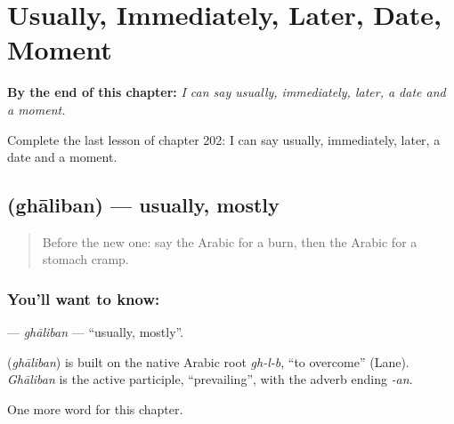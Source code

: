 
\chapter{Usually, Immediately, Later, Date, Moment}
\label{ch:ar-usually-immediately-later-date-moment}

\begin{chapteropening}
\textbf{By the end of this chapter:} \emph{I can say usually, immediately, later, a date and a moment.}

Complete the last lesson of chapter 202: I can say usually, immediately, later, a date and a moment.
\end{chapteropening}

\section[\texorpdfstring{\ar{غالبا} (ghāliban)}{غالبا (ghāliban)}]{ (ghāliban) — usually, mostly}

\label{lesson:AR-C202-ghaliban}



\begin{quote}
Before the new one: say the Arabic for a burn, then the Arabic for a stomach cramp.
\end{quote}

\subsection*{You'll want to know: }
\textbf{} — \emph{ghāliban} — \textquotedblleft{}usually, mostly\textquotedblright{}.

\begin{cousinweb}
\textbf{} (\emph{ghāliban}) is built on the native Arabic root \emph{gh-l-b}, \textquotedblleft{}to overcome\textquotedblright{} (Lane). \emph{Ghāliban} is the active participle, \textquotedblleft{}prevailing\textquotedblright{}, with the adverb ending \emph{-an}.
\end{cousinweb}

\begin{grammarlens}[title={What you've built}]
One more word for this chapter.
\end{grammarlens}

